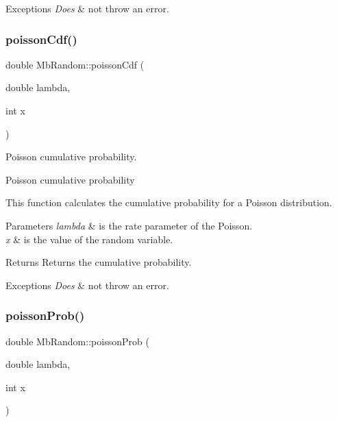 \begin{DoxyExceptions}{Exceptions}
{\em Does} & not throw an error. \\
\hline
\end{DoxyExceptions}
\mbox{\label{class_mb_random_adb0a8b9aa025f68a6ef519581c28d37b}} 
\subsubsection{\texorpdfstring{poissonCdf()}{poissonCdf()}}
{\footnotesize\ttfamily double Mb\+Random\+::poisson\+Cdf (\begin{DoxyParamCaption}\item[{double}]{lambda,  }\item[{int}]{x }\end{DoxyParamCaption})}



Poisson cumulative probability. 

Poisson cumulative probability

This function calculates the cumulative probability for a Poisson distribution.


\begin{DoxyParams}{Parameters}
{\em lambda} & is the rate parameter of the Poisson. \\
\hline
{\em x} & is the value of the random variable. \\
\hline
\end{DoxyParams}
\begin{DoxyReturn}{Returns}
Returns the cumulative probability. 
\end{DoxyReturn}

\begin{DoxyExceptions}{Exceptions}
{\em Does} & not throw an error. \\
\hline
\end{DoxyExceptions}
\mbox{\label{class_mb_random_a5ecfd1d9b7c3c426842b27d82b37d524}} 
\subsubsection{\texorpdfstring{poissonProb()}{poissonProb()}}
{\footnotesize\ttfamily double Mb\+Random\+::poisson\+Prob (\begin{DoxyParamCaption}\item[{double}]{lambda,  }\item[{int}]{x }\end{DoxyParamCaption})\hspace{0.3cm}{\ttfamily [inline]}}



